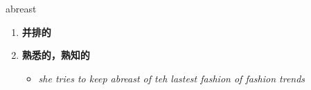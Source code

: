 
\begin{frame}
{\huge abreast}
\begin{center}
\begin{enumerate}\Large
  \item \textbf{并排的}
  \item \textbf{熟悉的，熟知的}
  \begin{itemize}
    \item \em{\Large{she tries to keep abreast of teh lastest fashion of fashion trends}}
  \end{itemize}
\end{enumerate}
\end{center}
\end{frame}
